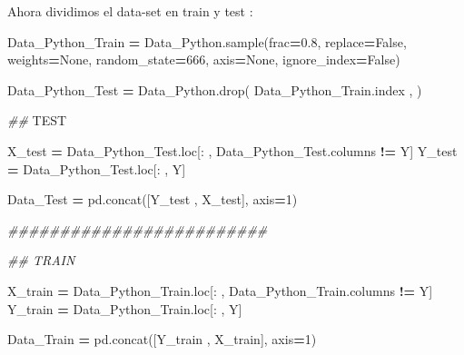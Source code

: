 \documentclass[
  11pt,
  a4paper,
]{article}
\newenvironment{Shaded}{\begin{snugshade}}{\end{snugshade}}
\newcommand{\AlertTok}[1]{\textcolor[rgb]{0.94,0.16,0.16}{#1}}
\newcommand{\CommentTok}[1]{\textcolor[rgb]{0.56,0.35,0.01}{\textit{#1}}}
\newcommand{\DecValTok}[1]{\textcolor[rgb]{0.00,0.00,0.81}{#1}}
\newcommand{\FloatTok}[1]{\textcolor[rgb]{0.00,0.00,0.81}{#1}}
\newcommand{\NormalTok}[1]{#1}
\newcommand{\OperatorTok}[1]{\textcolor[rgb]{0.81,0.36,0.00}{\textbf{#1}}}
\newcommand{\StringTok}[1]{\textcolor[rgb]{0.31,0.60,0.02}{#1}}
\newcommand{\VariableTok}[1]{\textcolor[rgb]{0.00,0.00,0.00}{#1}}
\begin{document}
\vspace{0.5cm}

Ahora dividimos el data-set en train y test :

\begin{Shaded}
\begin{Highlighting}[]
\NormalTok{Data\_Python\_Train }\OperatorTok{=}\NormalTok{ Data\_Python.sample(frac}\OperatorTok{=}\FloatTok{0.8}\NormalTok{, replace}\OperatorTok{=}\VariableTok{False}\NormalTok{, weights}\OperatorTok{=}\VariableTok{None}\NormalTok{, random\_state}\OperatorTok{=}\DecValTok{666}\NormalTok{, axis}\OperatorTok{=}\VariableTok{None}\NormalTok{, ignore\_index}\OperatorTok{=}\VariableTok{False}\NormalTok{)}

\NormalTok{Data\_Python\_Test }\OperatorTok{=}\NormalTok{ Data\_Python.drop( Data\_Python\_Train.index , )}
\end{Highlighting}
\end{Shaded}

\begin{Shaded}
\begin{Highlighting}[]
\CommentTok{\#\# }\AlertTok{TEST}

\NormalTok{X\_test }\OperatorTok{=}\NormalTok{ Data\_Python\_Test.loc[: , Data\_Python\_Test.columns }\OperatorTok{!=} \StringTok{\textquotesingle{}Y\textquotesingle{}}\NormalTok{]}
\NormalTok{Y\_test }\OperatorTok{=}\NormalTok{ Data\_Python\_Test.loc[: , }\StringTok{\textquotesingle{}Y\textquotesingle{}}\NormalTok{]}

\NormalTok{Data\_Test }\OperatorTok{=}\NormalTok{ pd.concat([Y\_test , X\_test], axis}\OperatorTok{=}\DecValTok{1}\NormalTok{)}

\CommentTok{\#\#\#\#\#\#\#\#\#\#\#\#\#\#\#\#\#\#\#\#\#\#\#\#\#}

\CommentTok{\#\# TRAIN}

\NormalTok{X\_train }\OperatorTok{=}\NormalTok{ Data\_Python\_Train.loc[: , Data\_Python\_Train.columns }\OperatorTok{!=} \StringTok{\textquotesingle{}Y\textquotesingle{}}\NormalTok{]}
\NormalTok{Y\_train }\OperatorTok{=}\NormalTok{ Data\_Python\_Train.loc[: , }\StringTok{\textquotesingle{}Y\textquotesingle{}}\NormalTok{]}

\NormalTok{Data\_Train }\OperatorTok{=}\NormalTok{ pd.concat([Y\_train , X\_train], axis}\OperatorTok{=}\DecValTok{1}\NormalTok{)}
\end{Highlighting}
\end{Shaded}

\newpage
\end{document}
